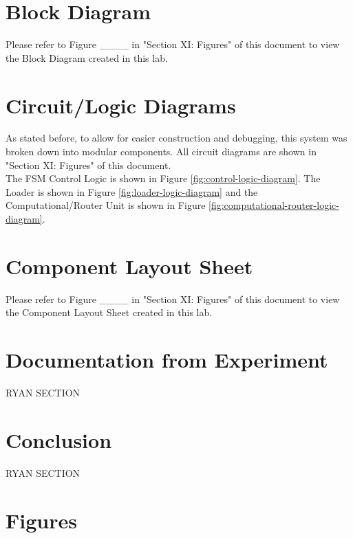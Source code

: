 \documentclass[journal, twocolumn, final,11pt,letterpaper]{IEEEtran}
\begin{document}
\section{Block Diagram} 
Please refer to Figure \_\_\_\_ in "Section XI: Figures" of this document to view the Block Diagram created in this lab.
 
\section{Circuit/Logic Diagrams}
As stated before, to allow for easier  construction and debugging, this system was broken down into modular components. All circuit diagrams are shown in "Section XI: Figures" of this document.\\
 
The FSM Control Logic is shown in Figure \ref{fig:control-logic-diagram}. The Loader is shown in Figure \ref{fig:loader-logic-diagram} and the Computational/Router Unit is shown in Figure \ref{fig:computational-router-logic-diagram}.   
 
\section{Component Layout Sheet}
Please refer to Figure \_\_\_\_ in "Section XI: Figures" of this document to view the Component Layout Sheet created in this lab.

\section{Documentation from Experiment}
RYAN SECTION


\section{Conclusion}
RYAN SECTION

\clearpage
\onecolumn
\section{Figures}
\end{document}
